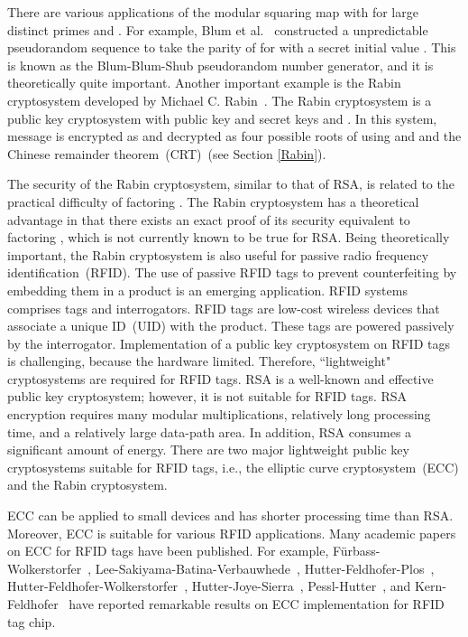 \documentclass{article}
\begin{document}
There are various applications of the modular squaring map with  for large distinct primes  and .
For example, Blum et al.~\cite{BBS} constructed a unpredictable pseudorandom sequence to take the parity of  for 
 with a secret initial value . 
This is known as the Blum-Blum-Shub pseudorandom number generator, and it is theoretically quite important. 
Another important example is the Rabin cryptosystem developed by Michael C. Rabin~\cite{Rabin}.
The Rabin cryptosystem is a public key cryptosystem with public key  and secret keys  and . 
In this system, message  is encrypted as  and decrypted as 
four possible roots of  using  and  and the 
Chinese remainder theorem~(CRT)~(see Section \ref{Rabin}). 

The security of the Rabin cryptosystem, similar to that of RSA, 
is related to the practical difficulty of factoring .
The Rabin cryptosystem has a theoretical advantage in that there exists an exact proof of 
its security equivalent to factoring , which is not currently known to be true for RSA.  
Being theoretically important, the Rabin cryptosystem is also useful 
for passive radio frequency identification~(RFID). 
The use of passive RFID tags to prevent counterfeiting by embedding them in a product is an emerging application. 
RFID systems comprises tags and interrogators.
RFID tags are low-cost wireless devices that associate a unique ID~(UID) with the product.
These tags are powered passively by the interrogator.
Implementation of a public key cryptosystem on RFID tags is challenging, 
because the hardware limited.  Therefore, ``lightweight" cryptosystems are required for RFID tags.
RSA is a well-known and effective public key cryptosystem; however, 
it is not suitable for RFID tags.
RSA encryption requires many modular multiplications, relatively long processing time, 
and a relatively large data-path area. 
In addition, RSA consumes a significant amount of energy. 
There are two major lightweight public key cryptosystems suitable for RFID tags, i.e., 
the elliptic curve cryptosystem~(ECC) and the Rabin cryptosystem. 

ECC can be applied to small devices and has shorter processing time than RSA. 
Moreover, ECC is suitable for various RFID applications. 
Many academic papers on ECC for RFID tags have been published.
For example, F\"urbass-Wolkerstorfer~\cite{Furbass}, Lee-Sakiyama-Batina-Verbauwhede~\cite{Lee}, 
Hutter-Feldhofer-Plos~\cite{Hutter1}, Hutter-Feldhofer-Wolkerstorfer~\cite{Hutter2}, 
Hutter-Joye-Sierra~\cite{Hutter3}, Pessl-Hutter~\cite{Hutter4}, and Kern-Feldhofer~\cite{Kern} 
have reported remarkable results on ECC implementation for RFID tag chip. 
\end{document}
